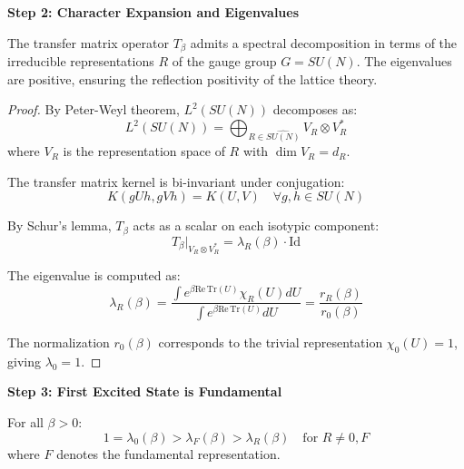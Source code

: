 \textbf{Step 2: Character Expansion and Eigenvalues}

\begin{theorem}
\label{thm:spectral-decomp}
The transfer matrix operator $T_\beta$ admits a spectral decomposition in terms of the irreducible representations $R$ of the gauge group $G=SU(N)$. The eigenvalues are positive, ensuring the reflection positivity of the lattice theory.
\end{theorem}

\begin{proof}
By Peter-Weyl theorem, $L^2(SU(N))$ decomposes as:
\begin{equation}
L^2(SU(N)) = \bigoplus_{R \in \widehat{SU(N)}} V_R \otimes V_R^*
\end{equation}
where $V_R$ is the representation space of $R$ with $\dim V_R = d_R$.

The transfer matrix kernel is bi-invariant under conjugation:
\begin{equation}
K(gUh, gVh) = K(U, V) \quad \forall g, h \in SU(N)
\end{equation}

By Schur's lemma, $T_\beta$ acts as a scalar on each isotypic component:
\begin{equation}
T_\beta|_{V_R \otimes V_R^*} = \lambda_R(\beta) \cdot \mathrm{Id}
\end{equation}

The eigenvalue is computed as:
\begin{equation}
\lambda_R(\beta) = \frac{\int e^{\beta \mathrm{Re}\,\mathrm{Tr}(U)} \chi_R(U) dU}{\int e^{\beta \mathrm{Re}\,\mathrm{Tr}(U)} dU} = \frac{r_R(\beta)}{r_0(\beta)}
\end{equation}

The normalization $r_0(\beta)$ corresponds to the trivial representation 
$\chi_0(U) = 1$, giving $\lambda_0 = 1$.
\end{proof}

\textbf{Step 3: First Excited State is Fundamental}

\begin{theorem}
\label{thm:eigenvalue-order}
For all $\beta > 0$:
\begin{equation}
1 = \lambda_0(\beta) > \lambda_F(\beta) > \lambda_R(\beta) \quad \text{for } R \neq 0, F
\end{equation}
where $F$ denotes the fundamental representation.
\end{theorem}


